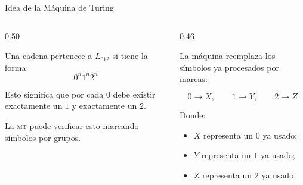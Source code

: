 \documentclass[aspectratio=1610, 12pt]{beamer}
\newcommand{\MT}{\textsc{mt}}
\begin{document}
\begin{frame}[t]{Idea de la Máquina de Turing}
\vspace{4pt}
\begin{columns}[T]

  \begin{column}{0.50\textwidth}
    \begin{defbox}
      \footnotesize
      Una cadena pertenece a $L_{012}$ si tiene la forma:
      \[
        0^n1^n2^n
      \]

      \vspace{2pt}
      Esto significa que por cada $0$ debe existir exactamente
      un $1$ y exactamente un $2$.

      \vspace{4pt}
      La \MT{} puede verificar esto marcando símbolos por grupos.
    \end{defbox}
  \end{column}

  \begin{column}{0.46\textwidth}
    \begin{exbox}
      \footnotesize
      La máquina reemplaza los símbolos ya procesados por marcas:

      \[
        0 \to X,\qquad 1 \to Y,\qquad 2 \to Z
      \]

      \vspace{4pt}
      Donde:

      \begin{itemize}\setlength{\itemsep}{3pt}
        \item $X$ representa un $0$ ya usado;
        \item $Y$ representa un $1$ ya usado;
        \item $Z$ representa un $2$ ya usado.
      \end{itemize}
    \end{exbox}
  \end{column}

\end{columns}
\end{frame}
\end{document}
